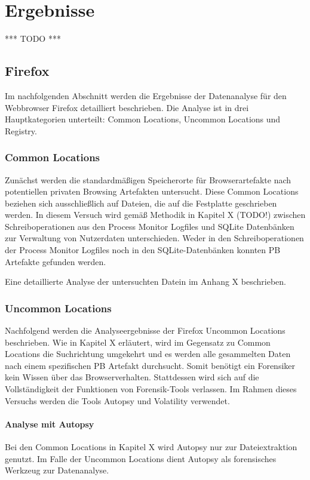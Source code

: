\chapter{Ergebnisse}

*** TODO ***

\section{Firefox}

Im nachfolgenden Abschnitt werden die Ergebnisse der Datenanalyse für den Webbrowser Firefox detailliert beschrieben. Die Analyse ist in drei Hauptkategorien unterteilt: Common Locations, Uncommon Locations und Registry.

\subsection*{Common Locations}
Zunächst werden die standardmäßigen Speicherorte für Browserartefakte nach potentiellen privaten Browsing Artefakten untersucht. Diese Common Locations beziehen sich ausschließlich auf Dateien, die auf die Festplatte geschrieben werden. In diesem Versuch wird gemäß Methodik in Kapitel X (TODO!) zwischen Schreiboperationen aus den Process Monitor Logfiles und SQLite Datenbänken zur Verwaltung von Nutzerdaten unterschieden. Weder in den Schreiboperationen der Process Monitor Logfiles noch in den SQLite-Datenbänken konnten PB Artefakte gefunden werden. 

Eine detaillierte Analyse der untersuchten Datein im Anhang X beschrieben.

\subsection*{Uncommon Locations}
Nachfolgend werden die Analyseergebnisse der Firefox Uncommon Locations beschrieben.
Wie in Kapitel X erläutert, wird im Gegensatz zu Common Locations die Suchrichtung umgekehrt und es werden alle gesammelten Daten nach einem spezifischen PB Artefakt durchsucht.
Somit benötigt ein Forensiker kein Wissen über das Browserverhalten. Stattdessen wird sich auf die Vollständigkeit der Funktionen von Forensik-Tools verlassen. Im Rahmen dieses Versuchs werden die Tools Autopsy und Volatility verwendet.

\subsubsection*{Analyse mit Autopsy}
Bei den Common Locations in Kapitel X wird Autopsy nur zur Dateiextraktion genutzt. Im Falle der Uncommon Locations dient Autopsy als forensisches Werkzeug zur Datenanalyse.

